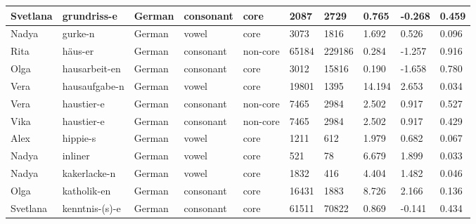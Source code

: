 \begin{longtable}{|p{1.2cm}|p{3cm}|p{1cm}|p{1.5cm}|p{1.5cm}|R{1.2cm}|R{1cm}|R{1cm}|R{0.8cm}|R{0.8cm}|}
Svetlana  & grundriss-e            & German        & consonant        & core      & 2087         & 2729           & 0.765                 & -0.268            & 0.459        \\ \hline
Nadya     & gurke-n                & German        & vowel            & core      & 3073         & 1816           & 1.692                 & 0.526             & 0.096        \\ \hline
Rita      & h\"{a}us-er            & German        & consonant        & non-core  & 65184        & 229186         & 0.284                 & -1.257            & 0.916        \\ \hline
Olga      & hausarbeit-en          & German        & consonant        & core      & 3012         & 15816          & 0.190                 & -1.658            & 0.780        \\ \hline
Vera      & hausaufgabe-n          & German        & vowel            & core      & 19801        & 1395           & 14.194                & 2.653             & 0.034        \\ \hline
Vera      & haustier-e             & German        & consonant        & non-core  & 7465         & 2984           & 2.502                 & 0.917             & 0.527        \\ \hline
Vika      & haustier-e             & German        & consonant        & non-core  & 7465         & 2984           & 2.502                 & 0.917             & 0.429        \\ \hline
Alex      & hippie-s               & German        & vowel            & core      & 1211         & 612            & 1.979                 & 0.682             & 0.067        \\ \hline
Nadya     & inliner                & German        & vowel            & core      & 521          & 78             & 6.679                 & 1.899             & 0.033        \\ \hline
Nadya     & kakerlacke-n           & German        & vowel            & core      & 1832         & 416            & 4.404                 & 1.482             & 0.046        \\ \hline
Olga      & katholik-en            & German        & consonant        & core      & 16431        & 1883           & 8.726                 & 2.166             & 0.136        \\ \hline
Svetlana  & kenntnis-(s)-e         & German        & consonant        & core      & 61511        & 70822          & 0.869                 & -0.141            & 0.434        \\ \hline

\end{longtable}
